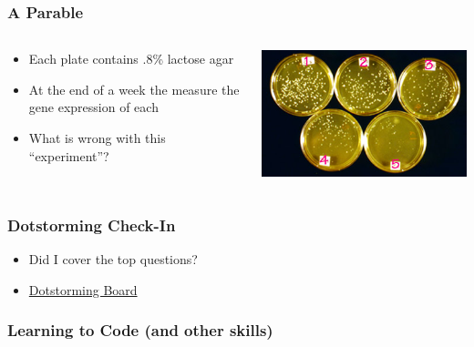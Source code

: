 \documentclass[14pt]{beamer}
\begin{document}
\begin{frame}
\frametitle{A Parable}
\begin{columns}
	\begin{column}{0.5\textwidth}
		\begin{itemize}
			\item<+-> Each plate contains .8\% lactose agar
			\item<+-> At the end of a week the measure the gene expression of each
			\item<+-> What is wrong with this ``experiment''?
		\end{itemize}
		\end{column}
	\begin{column}{0.5\textwidth}
		\begin{center}
     		\includegraphics[width=1\textwidth]{images_20170912_yeast.jpeg}
     	\end{center}
	\end{column}
\end{columns}
\end{frame}

\begin{frame}
\frametitle{Dotstorming Check-In}
\begin{itemize}
	\item Did I cover the top questions?
	\item \href{https://dotstorming.com/b/59b6a35f3b45421106effc50}{Dotstorming Board}
\end{itemize}
\end{frame}

\begin{frame}
\frametitle{Learning to Code (and other skills)}
\end{frame}
\end{document}
